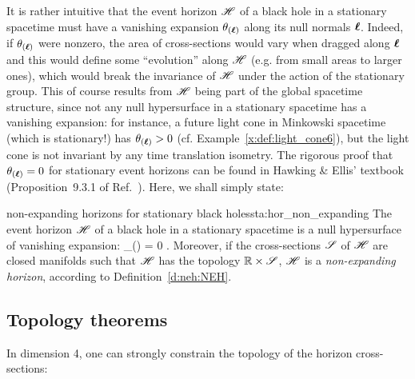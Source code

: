It is rather intuitive that the event horizon $\mathscr{H}$ of a black hole in
a stationary spacetime must have a vanishing expansion $\theta_{(\bm{\ell})}$ along its null
normals $\bm{\ell}$. Indeed, if $\theta_{(\bm{\ell})}$ were nonzero,
the area of cross-sections would vary when dragged
along $\bm{\ell}$ and this would define some ``evolution'' along $\mathscr{H}$ (e.g. from small areas
to larger ones),
which would break the invariance of $\mathscr{H}$ under the action of the stationary group.
This of course results from $\mathscr{H}$ being part of the global spacetime structure,
since not any null hypersurface in a stationary spacetime has a vanishing
expansion: for instance, a future light cone in Minkowski spacetime
(which is stationary!) has $\theta_{(\bm{\ell})}>0$
(cf. Example~\ref{x:def:light_cone6}),
but the light cone is not invariant by any time translation isometry.
The rigorous proof that $\theta_{(\bm{\ell})} = 0$
for stationary event horizons can be found in Hawking \& Ellis' textbook
(Proposition~9.3.1 of Ref.~\cite{HawkiE73}).
Here, we shall simply state:
\begin{tprop}{non-expanding horizons for stationary black holes}{sta:hor_non_expanding}
The event horizon $\mathscr{H}$ of a black hole in a stationary spacetime
is a null hypersurface of vanishing expansion:
\be
    \theta_{(\wl)} = 0 .
\ee
Moreover, if the cross-sections $\mathscr{S}$ of $\mathscr{H}$
are closed manifolds such that $\mathscr{H}$ has the topology $\mathbb{R}\times \mathscr{S}$, $\mathscr{H}$ is a
\emph{non-expanding horizon},
according to Definition~\ref{d:neh:NEH}.
\end{tprop}

\subsection{Topology theorems} \label{s:sta:topology}

In dimension 4, one can strongly constrain the topology of the horizon cross-sections:

